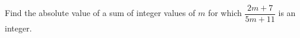 Find the absolute value of a sum of integer values of $m$ for which $\dfrac{2m+7}{5m+11}$ is an integer.
